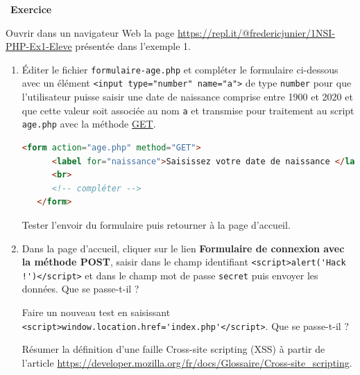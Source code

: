 \documentclass[
  11pt,
]{article}
\newcommand{\passthrough}[1]{#1}
\newcounter{exo}
\newenvironment{exercice}[1]
{\par \medskip   \addtocounter{exo}{1} \noindent  
\begin{bclogo}[arrondi =0.1,   noborder = true, logo=\bccrayon, marge=4]{~\textbf{Exercice} \textbf{\theexo} {\itshape #1} }  \par}
{
\end{bclogo}
 \par \bigskip }
\newcounter{def}
\begin{document}
\begin{exercice}{}

Ouvrir dans un navigateur Web la page
\url{https://repl.it/@fredericjunier/1NSI-PHP-Ex1-Eleve} présentée dans
l'exemple 1.

\begin{enumerate}
\def\labelenumi{\arabic{enumi}.}
\item
  Éditer le fichier \passthrough{\lstinline!formulaire-age.php!} et
  compléter le formulaire ci-dessous avec un élément
  \passthrough{\lstinline!<input type="number" name="a">!} de type
  \passthrough{\lstinline!number!} pour que l'utilisateur puisse saisir
  une date de naissance comprise entre 1900 et 2020 et que cette valeur
  soit associée au nom \passthrough{\lstinline!a!} et transmise pour
  traitement au script \passthrough{\lstinline!age.php!} avec la méthode
  \href{https://developer.mozilla.org/fr/docs/Web/HTTP/M\%C3\%A9thode/GET}{GET}.

\begin{lstlisting}[language=HTML]
   <form action="age.php" method="GET">
      <label for="naissance">Saisissez votre date de naissance </label> 
      <br>
      <!-- compléter -->
   </form>
\end{lstlisting}

  Tester l'envoir du formulaire puis retourner à la page d'accueil.
\item
  Dans la page d'accueil, cliquer sur le lien \textbf{Formulaire de
  connexion avec la méthode POST}, saisir dans le champ identifiant
  \passthrough{\lstinline"<script>alert('Hack !')</script>"} et dans le
  champ mot de passe \passthrough{\lstinline!secret!} puis envoyer les
  données. Que se passe-t-il ?

  Faire un nouveau test en saisissant
  \passthrough{\lstinline!<script>window.location.href='index.php'</script>!}.
  Que se passe-t-il ?

  Résumer la définition d'une faille Cross-site scripting (XSS) à partir
  de l'article
  \url{https://developer.mozilla.org/fr/docs/Glossaire/Cross-site_scripting}.


\end{enumerate}
\end{exercice}
\end{document}
